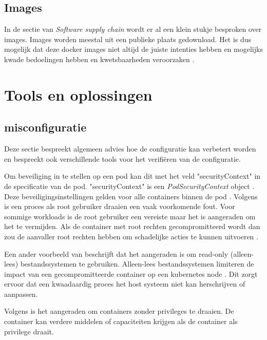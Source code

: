 \subsection{Images}
In de sectie van \textit{Software supply chain} wordt er al een klein stukje besproken over images. Images worden meestal uit een publieke plaats gedownload. Het is dus mogelijk dat deze docker images niet altijd de juiste intenties hebben en mogelijks kwade bedoelingen hebben en kwetsbaarheden veroorzaken \autocite{mytilinakis2020attack}. 



\section{Tools en oplossingen}

\subsection{misconfiguratie}
Deze sectie bespreekt algemeen advies hoe de configuratie kan verbetert worden en bespreekt ook verschillende tools voor het verifiëren van de configuratie.\newline

Om beveiliging in te stellen op een pod kan dit met het veld "securityContext" in de specificatie van de pod. "securityContext" is een \textit{PodSecurityContext} object \autocite{KubernetesDocs-2023}. 
Deze beveiligingsinstellingen gelden voor alle containers binnen de pod \autocite{KubernetesDocs-2023}. 
Volgens \textcite{OWASP-2023} is een proces als root gebruiker draaien een vaak voorkomende fout. Voor sommige workloads is de root gebruiker een vereiste maar het is aangeraden om het te vermijden. Als de container met root rechten gecompromitteerd wordt dan zou de aanvaller root rechten hebben om schadelijke acties te kunnen uitvoeren \autocite{OWASP-2023}.  

Een ander voorbeeld van \textcite{OWASP-2023} beschrijft dat het aangeraden is om read-only (alleen-lees) bestandssystemen te gebruiken. Alleen-lees bestandssystemen limiteren de impact van een gecompromitteerde container op een kubernetes node \autocite{OWASP-2023}. Dit zorgt ervoor dat een kwaadaardig proces het host systeem niet kan herschrijven of aanpassen.

Volgens \textcite{OWASP-2023} is het aangeraden om containers zonder privileges te draaien. De container kan verdere middelen of capaciteiten krijgen als de container als privilege draait. 

